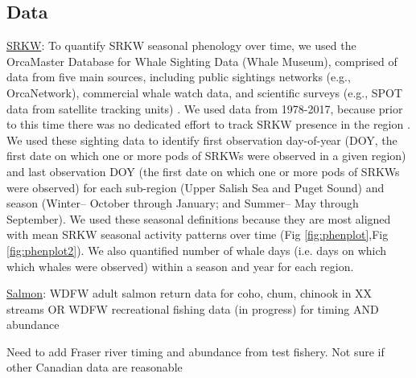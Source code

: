 \documentclass{article}
\begin{document}
\subsection* {Data}

\par \underline{SRKW}: To quantify SRKW seasonal phenology over time, we used the OrcaMaster Database for Whale Sighting Data (Whale Museum), comprised of data from five main sources, including public sightings networks (e.g., OrcaNetwork), commercial whale watch data, and scientific surveys (e.g., SPOT data from satellite tracking units) \citep{olson2018}. We used data from 1978-2017, because prior to this time there was no dedicated effort to track SRKW presence in the region \citep{olson2018}. We used these sighting data to identify first observation day-of-year (DOY, the first date on which one or more pods of SRKWs were observed in a given region) and last observation DOY (the first date on which one or more pods of SRKWs were observed) for each sub-region (Upper Salish Sea and Puget Sound) and season (Winter-- October through January; and Summer-- May through September). We used these seasonal definitions because they are most aligned with mean SRKW seasonal activity patterns over time (Fig \ref{fig:phenplot},Fig \ref{fig:phenplot2}). We also quantified number of whale days (i.e. days on which which whales were observed) within a season and year for each region. 


\par \underline{Salmon}:  WDFW adult salmon return data for coho, chum, chinook in XX streams OR WDFW recreational fishing data (in progress) for timing AND abundance
\par Need to add Fraser river timing and abundance from test fishery. Not sure if other Canadian data are reasonable
\end{document}
